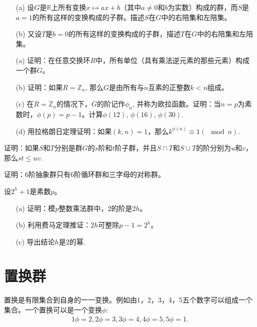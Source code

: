 \begin{problemset}
\item \begin{enumerate}
\item[(a)] 设$G$是$\mathbb{R}$上所有变换$x \mapsto ax+b$（其中$a \neq 0$和$b$为实数）构成的群，而$S$是$a=1$的所有这样的变换构成的子群。描述$S$在$G$中的右陪集和左陪集。
\item[(b)] 又设$T$是$b=0$的所有这样的变换构成的子群，描述$T$在$G$中的右陪集和左陪集。
\end{enumerate}

\item \begin{enumerate}
\item[(a)] 证明：在任意交换环$R$中，所有单位（具有乘法逆元素的那些元素）构成一个群$G$。
\item[(b)] 证明：如果$R = \mathbb{Z}_n$, 那么$G$是由所有与$n$互素的正整数$k < n$组成。
\item[(c)] 在$R = \mathbb{Z}_n$的情况下，$G$的阶记作$\phi_n$, 并称为欧拉函数。证明：当$n=p$为素数时，$\phi(p)=p-1$。计算$\phi(12)$, $\phi(16)$, $\phi(30)$.
\item[(d)] 用拉格朗日定理证明：如果$(k, n)=1$，那么$k^{\phi(n)} \equiv 1(\mod{n})$.
\end{enumerate}

\item 证明：如果$S$和$T$分别是群$G$的$s$阶和$t$阶子群，并且$S \cap T$和$S \cup T$的阶分别为$u$和$v$，那么$st \le uv$.

\item 证明：6阶抽象群只有6阶循环群和三字母的对称群。

\item 设$2^h+1$是素数$p$。
\begin{enumerate}
\item[(a)] 证明：模$p$整数乘法群中，$2$的阶是$2h$。
\item[(b)] 利用费马定理推证：$2h$可整除$p-1=2^h$。
\item[(c)] 导出结论$h$是$2$的幂.
\end{enumerate}

\end{problemset}



\section{置换群}\label{section0010609}
置换是有限集合到自身的一一变换。例如由1，2，3，4，5五个数字可以组成一个集合。一个置换可以是一个变换$\phi$:
\begin{gather}\label{equ001060910}
1\phi=2, 2\phi=3, 3\phi=4, 4\phi=5, 5\phi=1.
\end{gather}




